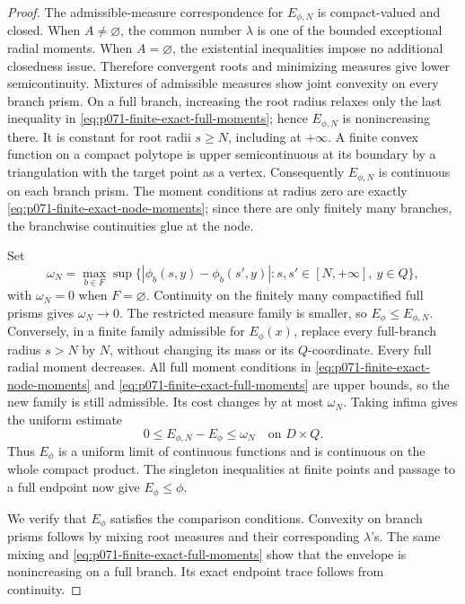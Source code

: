 \begin{proof}
The admissible-measure correspondence for \(E_{\phi,N}\) is compact-valued
and closed.  When \(A\ne\varnothing\), the common number \(\lambda\) is one
of the bounded exceptional radial moments.  When \(A=\varnothing\), the
existential inequalities impose no additional closedness issue.  Therefore
convergent roots and minimizing measures give lower semicontinuity.
Mixtures of admissible measures show joint convexity on every branch prism.
On a full branch, increasing the root radius relaxes only the last
inequality in \eqref{eq:p071-finite-exact-full-moments}; hence
\(E_{\phi,N}\) is nonincreasing there.  It is constant for root radii
\(s\geq N\), including at \(+\infty\).  A finite convex function on a
compact polytope is upper semicontinuous at its boundary by a triangulation
with the target point as a vertex.  Consequently \(E_{\phi,N}\) is
continuous on each branch prism.  The moment conditions at radius zero are
exactly \eqref{eq:p071-finite-exact-node-moments}; since there are only
finitely many branches, the branchwise continuities glue at the node.

Set
\[
 \omega_N=\max_{b\in F}\sup\{
   |\phi_b(s,y)-\phi_b(s',y)|:
   s,s'\in[N,+\infty],\ y\in Q\},
\]
with \(\omega_N=0\) when \(F=\varnothing\).  Continuity on the finitely many
compactified full prisms gives \(\omega_N\to0\).  The restricted measure
family is smaller, so \(E_\phi\leq E_{\phi,N}\).  Conversely, in a finite
family admissible for \(E_\phi(x)\), replace every full-branch radius
\(s>N\) by \(N\), without changing its mass or its \(Q\)-coordinate.
Every full radial moment decreases.  All full moment conditions in
\eqref{eq:p071-finite-exact-node-moments} and
\eqref{eq:p071-finite-exact-full-moments} are upper bounds, so the new
family is still admissible.  Its cost changes by at most \(\omega_N\).
Taking infima gives the uniform estimate
\begin{equation}
             0\leq E_{\phi,N}-E_\phi\leq\omega_N
             \quad\text{on }D\times Q.
 \label{eq:p071-finite-exact-uniform-truncation}
\end{equation}
Thus \(E_\phi\) is a uniform limit of continuous functions and is
continuous on the whole compact product.  The singleton inequalities at
finite points and passage to a full endpoint now give \(E_\phi\leq\phi\).

We verify that \(E_\phi\) satisfies the comparison conditions.  Convexity
on branch prisms follows by mixing root measures and their corresponding
\(\lambda\)'s.  The same mixing and
\eqref{eq:p071-finite-exact-full-moments} show that the envelope is
nonincreasing on a full branch.  Its exact endpoint trace follows from
continuity.


\end{proof}
